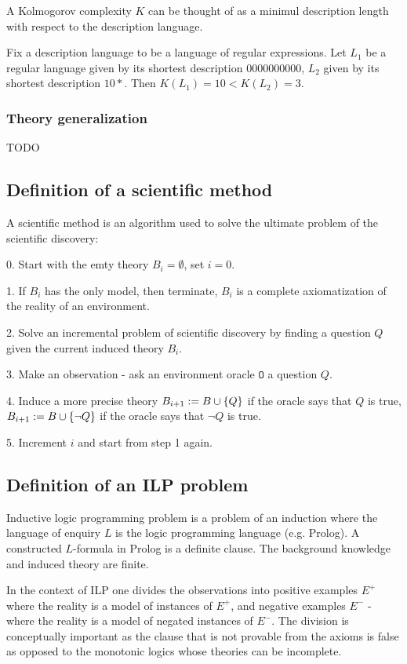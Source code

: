 \begin{note}
A Kolmogorov complexity $K$ can be thought of as a minimul description length with respect to the description language.
\end{note}
\begin{exmp}
Fix a description language to be a language of regular expressions. Let $L_1$ be a regular language given by its shortest description $0000000000$, $L_2$ given by its shortest description $10*$. Then $K(L_1)=10<K(L_2)=3$.
\end{exmp}

\subsubsection{Theory generalization}
TODO

\subsection{Definition of a scientific method}
\label{scientific_method}
A scientific method is an algorithm used to solve the ultimate problem of the scientific discovery:

0. Start with the emty theory $B_i=\emptyset$, set $i=0$.

1. If $B_i$ has the only model, then terminate, $B_i$ is a complete axiomatization of the reality of an environment.

2. Solve an incremental problem of scientific discovery by finding a question $Q$ given the current induced theory $B_i$.

3. Make an observation - ask an environment oracle $\mathtt{O}$ a question $Q$.

4. Induce a more precise theory $B_{i+1}:=B \cup \{Q\}$ if the oracle says that $Q$ is true, $B_{i+1}:=B \cup \{\neg Q\}$ if the oracle says that $\neg Q$ is true.

5. Increment $i$ and start from step 1 again.

\subsection{Definition of an ILP problem}
Inductive logic programming problem is a problem of an induction where the language of enquiry $L$ is the logic programming language (e.g. Prolog). A constructed $L$-formula in Prolog is a definite clause. The background knowledge and induced theory are finite.

In the context of ILP one divides the observations into positive examples $E^+$ where the reality is a model of instances of $E^+$, and negative examples $E^-$ - where the reality is a model of negated instances of $E^-$. The division is conceptually important as the clause that is not provable from the axioms is false as opposed to the monotonic logics whose theories can be incomplete.

